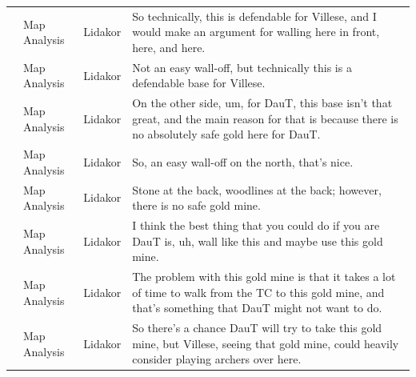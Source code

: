 {\begin{longtable}{@{}>{\theAppRow}r|L{2.3cm}L{1.0cm}U{11.55cm}@{}}
    & Map Analysis          & Lidakor & So technically, this is defendable for Villese, and I would make an argument for walling here in front, here, and here.                                                                                                                                                                         \\
    & Map Analysis          & Lidakor & Not an easy wall-off, but technically this is a defendable base for Villese.                                                                                                                                                                                                                    \\
    & Map Analysis          & Lidakor & On the other side, um, for DauT, this base isn't that great, and the main reason for that is because there is no absolutely safe gold here for DauT.                                                                                                                                            \\
    & Map Analysis          & Lidakor & So, an easy wall-off on the north, that's nice.                                                                                                                                                                                                                                                 \\
    & Map Analysis          & Lidakor & Stone at the back, woodlines at the back; however, there is no safe gold mine.                                                                                                                                                                                                                  \\
    & Map Analysis          & Lidakor & I think the best thing that you could do if you are DauT is, uh, wall like this and maybe use this gold mine.                                                                                                                                                                                   \\
    & Map Analysis          & Lidakor & The problem with this gold mine is that it takes a lot of time to walk from the TC to this gold mine, and that's something that DauT might not want to do.                                                                                                                                      \\
    & Map Analysis          & Lidakor & So there's a chance DauT will try to take this gold mine, but Villese, seeing that gold mine, could heavily consider playing archers over here.                                                                                                                                                 \\

\end{longtable}}
